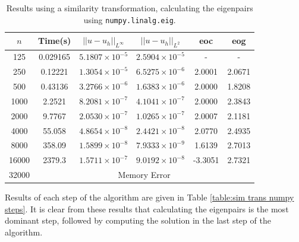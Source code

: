 \documentclass[11pt]{article}
\numberwithin{equation}{section}
\begin{document}
\begin{table}[H]
\centering
\begin{tabular}{|c|c|c|c|c|c|}
\hline
$n$ & Time(s) & $|| u - u_h ||_{L^{\infty}}$ &$|| u - u_h ||_{L^{2}}$ & eoc & eog \\
\hline
125 & 0.029165 & $5.1807 \times 10^{-5}$ & $2.5904 \times 10^{-5}$ & -  & - \\
250 & 0.12221 & $1.3054 \times 10^{-5}$ & $6.5275 \times 10^{-6}$ & 2.0001 &   2.0671 \\
500 & 0.43136 & $3.2766 \times 10^{-6}$ & $1.6383 \times 10^{-6}$ & 2.0000 & 1.8208   \\
1000 & 2.2521 & $8.2081 \times 10^{-7}$ & $4.1041 \times 10^{-7}$ & 2.0000 & 2.3843   \\
2000 & 9.7767 & $2.0530 \times 10^{-7}$ & $1.0265 \times 10^{-7}$ & 2.0007 & 2.1181   \\
4000 & 55.058 & $4.8654 \times 10^{-8}$ & $2.4421 \times 10^{-8}$ & 2.0770 &   2.4935 \\
8000 & 358.09  & $1.5899 \times 10^{-8}$ & $7.9333 \times 10^{-9}$ & 1.6139 & 2.7013   \\
16000 & 2379.3 & $1.5711 \times 10^{-7}$ & $9.0192 \times 10^{-8}$ & -3.3051 & 2.7321 \\
\cline{2-6}
32000 & \multicolumn{5}{c|}{Memory Error} \\
\hline
\end{tabular}
\captionsetup{justification=centering}
\caption{Results using a similarity transformation, calculating the eigenpairs using \texttt{numpy.linalg.eig}.}
\label{table:sim trans numpy}
\end{table}

Results of each step of the algorithm are given in Table \ref{table:sim trans numpy steps}. It is clear from these results that calculating the eigenpairs is the most dominant step, followed by computing the solution in the last step of the algorithm.
\end{document}

